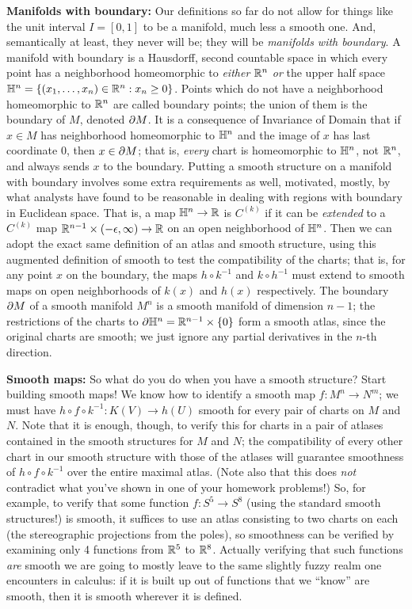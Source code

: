 {\bf Manifolds with boundary:} Our definitions so far do not allow for things like the unit
interval $I=[0,1]$ to be a manifold, much less a smooth one. And, semantically at least,
they never will be; they will be {\it manifolds with boundary}. A manifold with boundary is
a Hausdorff, second countable space in which every point has a neighborhood homeomorphic
to {\it either} ${\Bbb R}^n$ {\it or} the upper half space ${\Bbb H}^n = \{(x_1,\ldots ,x_n)\in{\Bbb R}^n : 
x_n\geq 0\}$. Points which do not have a neighborhood homeomorphic to ${\Bbb R}^n$ are called
boundary points; the union of them is the boundary of $M$, denoted $\partial M$. It is a 
consequence of Invariance of Domain that if $x\in M$ has neighborhood homeomorphic to 
${\Bbb H}^n$ and the image of $x$ has last coordinate $0$, then $x\in \partial M$; that is,
{\it every} chart is homeomorphic to ${\Bbb H}^n$, not ${\Bbb R}^n$, and always sends $x$ to the 
boundary. Putting a smooth structure on a manifold with boundary involves some extra
requirements as well, motivated, mostly, by what analysts have found to be reasonable
in dealing with regions with boundary in Euclidean space. That is, a map ${\Bbb H}^n\rightarrow {\Bbb R}$
is $C^{(k)}$ if it can be {\it extended} to a $C^{(k)}$ map 
${\Bbb R}^{n-1}\times (-\epsilon,\infty)\rightarrow {\Bbb R}$ on an open neighborhood of ${\Bbb H}^n$.
Then we can adopt the exact same definition of an atlas and smooth structure, using
this augmented definition of smooth to test the compatibility of the charts; that is, for
any point $x$ on the boundary, the maps $h\circ k^{-1}$ and $k\circ h^{-1}$ must extend to smooth 
maps on open neighborhoods of $k(x)$ and $h(x)$ respectively. The boundary $\partial M$ of a smooth
manifold $M^n$ is a smooth manifold of dimension $n-1$; the restrictions of the charts to 
$\partial{\Bbb H}^n={\Bbb R}^{n-1}\times \{0\}$ form a smooth atlas, since the original charts are smooth;
we just ignore any partial derivatives in the $n$-th direction.

\msk

{\bf Smooth maps:} So what do you do when you have a smooth structure? 
Start building smooth maps!
We know how to identify a smooth map $f:M^n\rightarrow N^m$; we must have
$h\circ f \circ k^{-1}:K(V)\rightarrow h(U)$ smooth for every pair of charts
on $M$ and $N$. Note that it is enough, though, to verify this for charts in 
a pair of atlases contained in the smooth structures for $M$ and $N$; the 
compatibility of every other chart in our smooth structure with those of the atlases
will guarantee smoothness of $h\circ f \circ k^{-1}$ over the entire maximal atlas.
(Note also that this does {\it not} contradict what you've shown in one of your
homework problems!) So, for example, to verify that some function $f:S^5\rightarrow S^8$
(using the standard smooth structures!) is smooth, it suffices to use an atlas 
consisting to two charts on each (the stereographic projections from the poles),
so smoothness can be verified by examining only 4 functions from ${\Bbb R}^5$ to ${\Bbb R}^8$.
Actually verifying that such functions {\it are} smooth we are going to mostly leave
to the same slightly fuzzy realm one encounters in calculus: if it is built up 
out of functions that we ``know'' are smooth, then it is smooth wherever it is 
defined. 

